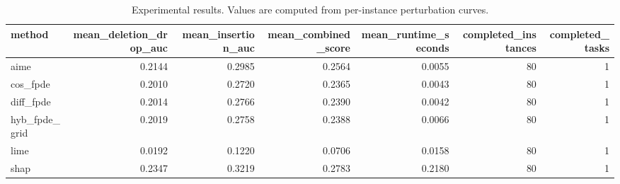 \begin{table}[t]
\caption{Experimental results. Values are computed from per-instance perturbation curves.}
\label{tab:main_results_computed}
\centering
\begin{tabular}{lrrrrrr}
\toprule
method & mean\_deletion\_drop\_auc & mean\_insertion\_auc & mean\_combined\_score & mean\_runtime\_seconds & completed\_instances & completed\_tasks \\
\midrule
aime & 0.2144 & 0.2985 & 0.2564 & 0.0055 & 80 & 1 \\
cos\_fpde & 0.2010 & 0.2720 & 0.2365 & 0.0043 & 80 & 1 \\
diff\_fpde & 0.2014 & 0.2766 & 0.2390 & 0.0042 & 80 & 1 \\
hyb\_fpde\_grid & 0.2019 & 0.2758 & 0.2388 & 0.0066 & 80 & 1 \\
lime & 0.0192 & 0.1220 & 0.0706 & 0.0158 & 80 & 1 \\
shap & 0.2347 & 0.3219 & 0.2783 & 0.2180 & 80 & 1 \\
\bottomrule
\end{tabular}

\end{table}

